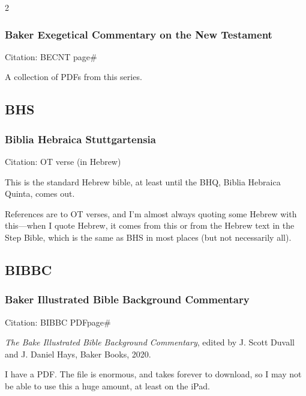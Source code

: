 \begin{multicols}{2}
		\subsubsection*{Baker Exegetical Commentary on the New Testament}
		
			Citation:
				BECNT page\#
				
			A collection of PDFs from this series.
			
	\subsection*{BHS}
	
		\subsubsection*{Biblia Hebraica Stuttgartensia}
		
			Citation:
				OT verse (in Hebrew)
				
			This is the standard Hebrew bible, at least until the BHQ, Biblia Hebraica Quinta, comes out.
			
			References are to OT verses, and I'm almost always quoting some Hebrew with this---when I quote Hebrew, it comes from this or from the Hebrew text in the Step Bible, which is the same as BHS in most places (but not necessarily all).
			
	\subsection*{BIBBC}
	
		\subsubsection*{Baker Illustrated Bible Background Commentary}
		
			Citation:
				BIBBC PDFpage\#
		
			\textit{The Bake Illustrated Bible Background Commentary}, edited by J. Scott Duvall and J. Daniel Hays, Baker Books, 2020.
			
			I have a PDF. The file is enormous, and takes forever to download, so I may not be able to use this a huge amount, at least on the iPad.
			

\end{multicols}
